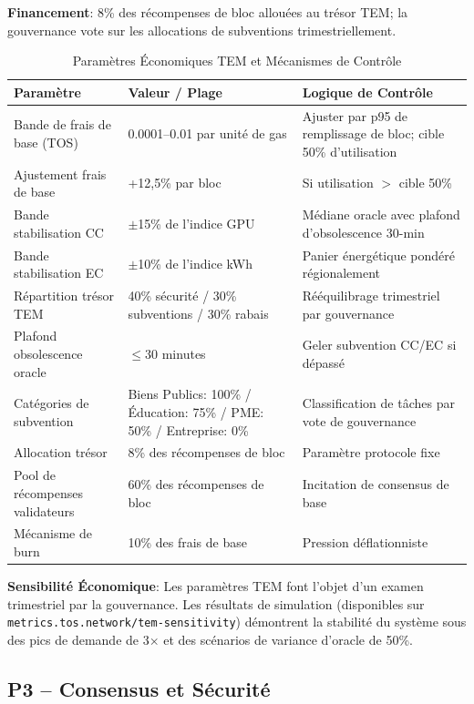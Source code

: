 \documentclass[11pt]{article}
\begin{document}
\textbf{Financement}: 8\% des récompenses de bloc allouées au trésor TEM; la gouvernance vote sur les allocations de subventions trimestriellement.
\begin{table}[H]
\centering
\caption{Paramètres Économiques TEM et Mécanismes de Contrôle}
\label{tab:tem-parameters}
\begin{tabular}{@{}p{}p{}p{}@{}}
\toprule
\textbf{Paramètre} & \textbf{Valeur / Plage} & \textbf{Logique de Contrôle} \\ \midrule
Bande de frais de base (TOS) & 0.0001--0.01 par unité de gas & Ajuster par p95 de remplissage de bloc; cible 50\% d'utilisation \\
Ajustement frais de base & +12,5\% par bloc & Si utilisation $>$ cible 50\% \\
Bande stabilisation CC & $\pm$15\% de l'indice GPU & Médiane oracle avec plafond d'obsolescence 30-min \\
Bande stabilisation EC & $\pm$10\% de l'indice kWh & Panier énergétique pondéré régionalement \\
Répartition trésor TEM & 40\% sécurité / 30\% subventions / 30\% rabais & Rééquilibrage trimestriel par gouvernance \\
Plafond obsolescence oracle & $\le$30 minutes & Geler subvention CC/EC si dépassé \\
Catégories de subvention & Biens Publics: 100\% / Éducation: 75\% / PME: 50\% / Entreprise: 0\% & Classification de tâches par vote de gouvernance \\
Allocation trésor & 8\% des récompenses de bloc & Paramètre protocole fixe \\
Pool de récompenses validateurs & 60\% des récompenses de bloc & Incitation de consensus de base \\
Mécanisme de burn & 10\% des frais de base & Pression déflationniste \\
\bottomrule
\end{tabular}
\end{table}
\textbf{Sensibilité Économique}: Les paramètres TEM font l'objet d'un examen trimestriel par la gouvernance. Les résultats de simulation (disponibles sur \texttt{metrics.tos.network/tem-sensitivity}) démontrent la stabilité du système sous des pics de demande de 3$\times$ et des scénarios de variance d'oracle de 50\%.
\subsection{P3 -- Consensus et Sécurité}
\label{sec:pillar-consensus}
\end{document}
